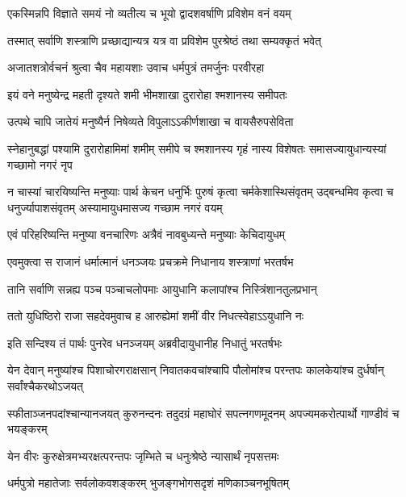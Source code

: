 \twolineshloka
{एकस्मिन्नपि विज्ञाते समयं नो व्यतीत्य च}
{भूयो द्वादशवर्षाणि प्रविशेम वनं वयम्}


\twolineshloka
{तस्मात् सर्वाणि शस्त्राणि प्रच्छाद्यान्यत्र यत्र वा}
{प्रविशेम पुरश्रेष्ठं तथा सम्यक्कृतं भवेत्}



\twolineshloka
{अजातशत्रोर्वचनं श्रुत्वा चैव महायशाः}
{उवाच धर्मपुत्रं तमर्जुनः परवीरहा}


\twolineshloka
{इयं वने मनुष्येन्द्र महती दृश्यते शमी}
{भीमशाखा दुरारोहा श्मशानस्य समीपतः}


\twolineshloka
{उत्पथे चापि जातेयं मनुष्यैर्न निषेव्यते}
{विपुलाऽऽकीर्णशाखा च वायसैरुपसेविता}


\onelineshloka
{स्नेहानुबद्धां पश्यामि दुरारोहामिमां शमीम्}
\twolineshloka
{समीपे च श्मशानस्य गृहं नास्य विशेषतः}
{समासज्यायुधान्यस्यां गच्छामो नगरं नृप}


\onelineshloka
{न चास्यां चारयिष्यन्ति मनुष्याः पार्थ केचन}
\threelineshloka
{धनुर्भिः पुरुषं कृत्वा चर्मकेशास्थिसंवृतम्}
{उद्बन्धमिव कृत्वा च धनुर्ज्यापाशसंवृतम्}
{अस्यामायुधमासज्य गच्छाम नगरं वयम्}


\twolineshloka
{एवं परिहरिष्यन्ति मनुष्या वनचारिणः}
{अत्रैवं नावबुध्यन्ते मनुष्याः केचिदायुधम्}



\twolineshloka
{एवमुक्त्वा स राजानं धर्मात्मानं धनञ्जयः}
{प्रचक्रमे निधानाय शस्त्राणां भरतर्षभ}


\twolineshloka
{तानि सर्वाणि सन्नह्य पञ्च पञ्चाचलोपमाः}
{आयुधानि कलापांश्च निस्त्रिंशानतुलप्रभान्}


\twolineshloka
{ततो युधिष्ठिरो राजा सहदेवमुवाच ह}
{आरुह्येमां शमीं वीर निधत्स्वेहाऽऽयुधानि नः}


\twolineshloka
{इति सन्दिश्य तं पार्थः पुनरेव धनञ्जयम्}
{अब्रवीदायुधानीह निधातुं भरतर्षभः}



\threelineshloka
{येन देवान् मनुष्यांश्च पिशाचोरगराक्षसान्}
{निवातकवचांश्चापि पौलोमांश्च परन्तपः}
{कालकेयांश्च दुर्धर्षान् सर्वांश्चैकरथोऽजयत्}


\threelineshloka
{स्फीताञ्जनपदांश्चान्यानजयत् कुरुनन्दनः}
{तदुदग्रं महाघोरं सपत्नगणमूदनम्}
{अपज्यमकरोत्पार्थो गाण्डीवं च भयङ्करम्}


\twolineshloka
{येन वीरः कुरुक्षेत्रमभ्यरक्षत्परन्तपः}
{जृम्भिते च धनुःश्रेष्ठे न्यासार्थं नृपसत्तमः}


\twolineshloka
{धर्मपुत्रो महातेजाः सर्वलोकवशङ्करम्}
{भुजङ्गभोगसदृशं मणिकाञ्चनभूषितम्}


